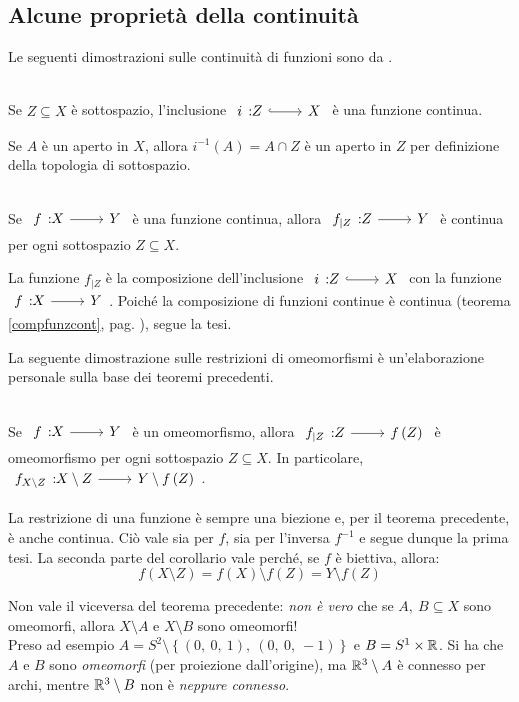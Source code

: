 \subsection{Alcune proprietà della continuità}
Le seguenti dimostrazioni sulle continuità di funzioni sono da \cite{munkres:2000topology}.
\begin{theorema}~{}\\
	Se $Z\subseteq X$ è sottospazio, l'inclusione $\incl{i}{Z}{X}$ è una funzione continua.
\end{theorema}
\begin{demonstration}
	Se $A$ è un aperto in $X$, allora $i^{-1}\left(A\right)=A\cap Z$ è un aperto in $Z$ per definizione della topologia di sottospazio.
\end{demonstration}
\begin{theorema}~{}\\
	Se $\funz{f}{X}{Y}$ è una funzione continua, allora $\funz{f_{\mid Z}}{Z}{Y}$ è continua per ogni sottospazio $Z\subseteq X$.
\end{theorema}
\begin{demonstration}
	La funzione $f_{\mid Z}$ è la composizione dell'inclusione $\incl{i}{Z}{X}$ con la funzione $\funz{f}{X}{Y}$. Poiché la composizione di funzioni continue è continua (teorema \ref{compfunzcont}, pag. \pageref{compfunzcont}), segue la tesi.
\end{demonstration}
La seguente dimostrazione sulle restrizioni di omeomorfismi è un'elaborazione personale sulla base dei teoremi precedenti.
\begin{corollary}~{}\\
Se $\funz{f}{X}{Y}$ è un omeomorfismo, allora $\funz{f_{\mid Z}}{Z}{f\left(Z\right)}$ è omeomorfismo per ogni sottospazio $Z\subseteq X$. In particolare, $\funz{f_{X\setminus Z}}{X\setminus Z}{Y\setminus f\left(Z\right)}$.
\end{corollary}
\begin{demonstration}
	La restrizione di una funzione è sempre una biezione e, per il teorema precedente, è anche continua. Ciò vale sia per $f$, sia per l'inversa $f^{-1}$ e segue dunque la prima tesi. La seconda parte del corollario vale perché, se $f$ è biettiva, allora:
	\begin{equation*}
		f\left(X\setminus Z\right)=f\left(X\right)\setminus f\left(Z\right)=Y\setminus f\left(Z\right)
	\end{equation*}
\vspace{-3mm}
\end{demonstration}
\begin{attention}
	Non vale il viceversa del teorema precedente: \textit{non è vero} che se $A,\ B\subseteq X$ sono omeomorfi, allora $X\setminus A$ e $X\setminus B$ sono omeomorfi!\\
	Preso ad esempio $A=S^2\setminus\left\{(0,\ 0,\ 1),\ (0,\ 0,\ -1)\right\}$ e $B=S^1\times \mathbb{R}$. Si ha che $A$ e $B$ sono \textit{omeomorfi} (per proiezione dall'origine), ma $\mathbb{R}^3\setminus A$ è connesso per archi, mentre $\mathbb{R}^3\setminus B$ non è \textit{neppure connesso}.
\end{attention}
